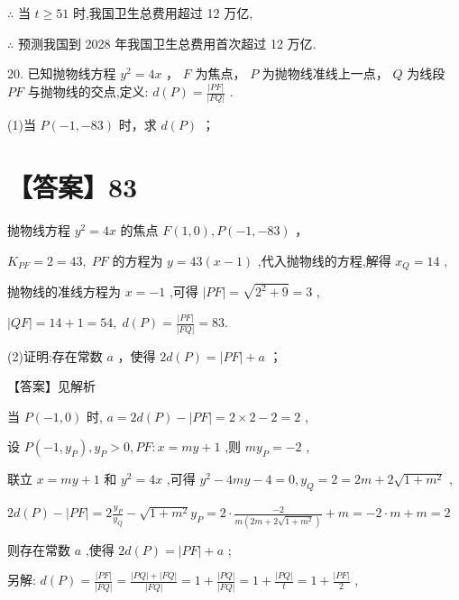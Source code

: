 \documentclass[10pt]{article}
\begin{document}
\(\therefore\) 当 \(t \geq  {51}\) 时,我国卫生总费用超过 12 万亿,

\(\therefore\) 预测我国到 2028 年我国卫生总费用首次超过 12 万亿.

20. 已知抛物线方程 \({y}^{2} = {4x}\) ， \(F\) 为焦点， \(P\) 为抛物线准线上一点， \(Q\) 为线段 \({PF}\) 与抛物线的交点,定义: \(d\left( P\right)  = \frac{\left| PF\right| }{\left| FQ\right| }\) .

(1)当 \(P\left( {-1, - {83}}\right)\) 时，求 \(d\left( P\right)\) ；

\section*{【答案】83}

抛物线方程 \({y}^{2} = {4x}\) 的焦点 \(F\left( {1,0}\right) ,P\left( {-1, - {83}}\right)\) ，

\({K}_{PF} = 2 = {43},\;{PF}\) 的方程为 \(y = {43}\left( {x - 1}\right)\) ,代入抛物线的方程,解得 \({x}_{Q} = {14}\) ,

抛物线的准线方程为 \(x =  - 1\) ,可得 \(\left| {PF}\right|  = \sqrt{{2}^{2} + 9} = 3\) ,

\(\left| {QF}\right|  = {14} + 1 = {54},\;d\left( P\right)  = \frac{\left| PF\right| }{\left| FQ\right| } = {83}.\)

(2)证明:存在常数 \(a\) ，使得 \({2d}\left( P\right)  = \left| {PF}\right|  + a\) ；

【答案】见解析

当 \(P\left( {-1,0}\right)\) 时, \(a = {2d}\left( P\right)  - \left| {PF}\right|  = 2 \times  2 - 2 = 2\) ,

设 \(P\left( {-1,{y}_{P}}\right) ,{y}_{P} > 0,{PF} : x = {my} + 1\) ,则 \(m{y}_{P} =  - 2\) ,

联立 \(x = {my} + 1\) 和 \({y}^{2} = {4x}\) ,可得 \({y}^{2} - {4my} - 4 = 0,{y}_{Q} = 2 = {2m} + 2\sqrt{1 + {m}^{2}}\) ,

\({2d}\left( P\right)  - \left| {PF}\right|  = 2\frac{{y}_{P}}{{y}_{Q}} - \sqrt{1 + {m}^{2}}{y}_{P} = 2 \cdot  \frac{-2}{m\left( {{2m} + 2\sqrt{1 + {m}^{2}}}\right) } + m =  - 2 \cdot  m + m = 2\)

则存在常数 \(a\) ,使得 \({2d}\left( P\right)  = \left| {PF}\right|  + a\) ;

另解: \(d\left( P\right)  = \frac{\left| PF\right| }{\left| FQ\right| } = \frac{\left| {PQ}\right|  + \left| {FQ}\right| }{\left| FQ\right| } = 1 + \frac{\left| PQ\right| }{\left| FQ\right| } = 1 + \frac{\left| PQ\right| }{t} = 1 + \frac{\left| PF\right| }{2}\) ,
\end{document}
